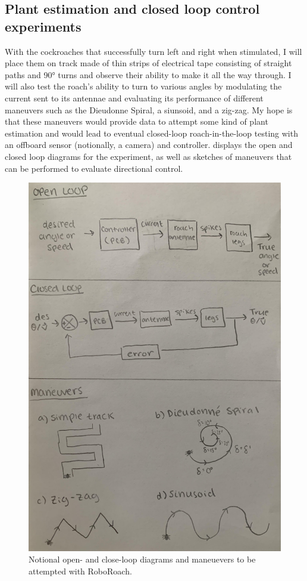\subsection{Plant estimation and closed loop control experiments}
With the cockroaches that successfully turn left and right when stimulated, I will place them on track made of thin strips of electrical tape consisting of straight paths and \ang{90} turns and observe their ability to make it all the way through. I will also test the roach's ability to turn to various angles by modulating the current sent to its antennae and evaluating its performance of different maneuvers such as the Dieudonne Spiral, a siunsoid, and a zig-zag. My hope is that these maneuvers would provide data to attempt some kind of plant estimation and would lead to eventual closed-loop roach-in-the-loop testing with an offboard sensor (notionally, a camera) and controller.  displays the open and closed loop diagrams for the experiment, as well as sketches of maneuvers that can be performed to evaluate directional control.
\begin{figure}[ht!]
\begin{center}
\includegraphics[scale=0.1]{Figures/olcl.jpg}
\end{center}
\caption{Notional open- and close-loop diagrams and maneuevers to be attempted with RoboRoach.}
\label{fig:rough}
\end{figure}

